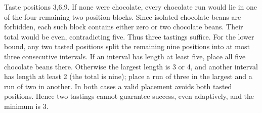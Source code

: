 Taste positions 3,6,9. If none were chocolate, every chocolate run would lie in one of the four remaining two-position blocks. Since isolated chocolate beans are forbidden, each such block contains either zero or two chocolate beans. Their total would be even, contradicting five. Thus three tastings suffice. For the lower bound, any two tasted positions split the remaining nine positions into at most three consecutive intervals. If an interval has length at least five, place all five chocolate beans there. Otherwise the largest length is 3 or 4, and another interval has length at least 2 (the total is nine); place a run of three in the largest and a run of two in another. In both cases a valid placement avoids both tasted positions. Hence two tastings cannot guarantee success, even adaptively, and the minimum is $\boxed3$.
